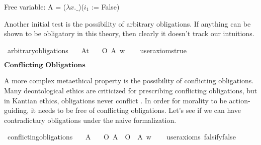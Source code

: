 \begin{isabellebody}
{  Free variable:
    A = ($\lambda x. \_$)($i_1$ := False)\color{black}%
}\isanewline
%
%
\endisatagproof
{\isafoldproof}%
%
\isadelimproof
%
\endisadelimproof
%
\begin{isamarkuptext}%
Another initial test is the possibility of arbitrary obligations. If anything can be shown to be 
obligatory in this theory, then clearly it doesn't track our intuitions.%
\end{isamarkuptext}\isamarkuptrue%
\isamarkupfalse%
\ arbitrary{\isacharunderscore}obligations{\isacharcolon}\isanewline
\ \ \ A{\isacharcolon}{\isacharcolon}{\isachardoublequoteopen}t{\isachardoublequoteclose}\isanewline
\ \ \ {\isachardoublequoteopen}O\ {\isacharbraceleft}A{\isacharbraceright}\ w{\isachardoublequoteclose}\isanewline
\ \ \isamarkupfalse%
\ {\isacharbrackleft}user{\isacharunderscore}axioms{\isacharequal}true{\isacharbrackright}%
\isadelimproof
\ %
\endisadelimproof
%
\isatagproof
{}\isamarkupfalse%
\isanewline
%
\isanewline
%
%
\endisatagproof
{\isafoldproof}%
%
\isadelimproof
%
\endisadelimproof
%
\begin{isamarkuptext}%
$\textbf{Conflicting Obligations}$%
\end{isamarkuptext}\isamarkuptrue%
%
\begin{isamarkuptext}%
A more complex metaethical property is the possibility of conflicting obligations. Many deontological
ethics are criticized for prescribing conflicting obligations, but in Kantian ethics, 
obligations never conflict \cite{contradictoryob}. In order for morality to be action-guiding, it needs to be free of 
conflicting obligations. Let's see if we can have contradictary obligations under the naive formalization.%
\end{isamarkuptext}\isamarkuptrue%
\isamarkupfalse%
\ conflicting{\isacharunderscore}obligations{\isacharcolon}\isanewline
\ \ \ A\isanewline
\ \ \ {\isachardoublequoteopen}{\isacharparenleft}O\ {\isacharbraceleft}A{\isacharbraceright}\ \isactrlbold {\isasymand}\ O\ {\isacharbraceleft}\isactrlbold {\isasymnot}\ A{\isacharbraceright}{\isacharparenright}\ w{\isachardoublequoteclose}\isanewline
\ \ \isamarkupfalse%
\ {\isacharbrackleft}user{\isacharunderscore}axioms{\isacharcomma}\ falsify{\isacharequal}false{\isacharbrackright}%
\isadelimproof
\ %
\endisadelimproof
%
\isatagproof
{}\isamarkupfalse%
\isanewline
%
\end{isabellebody}
